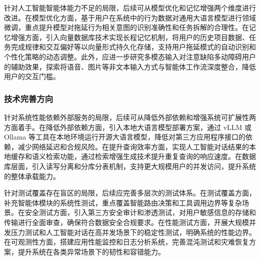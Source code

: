 \par 针对人工智能智能体能力不足的局限，后续可从模型优化和记忆增强两个维度进行改进。在模型优化方面，基于用户在系统中的行为数据对通用大语言模型进行领域微调，重点提升模型对拖延行为相关意图的识别准确性和任务拆解的合理性。在记忆增强方面，引入向量数据库技术实现长程记忆机制，将用户的历史项目数据、任务完成规律和交互偏好等以向量形式持久化存储，支持用户拖延模式的自动识别和个性化策略的动态调整。此外，应进一步研究多模态输入对注意缺陷多动障碍用户的辅助效果，探索将语音、图片等非文本输入方式与智能体工作流深度整合，降低用户的交互门槛。

\subsubsection{技术完善方向}

\par 针对系统性能依赖外部服务的局限，后续可从降低外部依赖和增强系统可扩展性两方面着手。在降低外部依赖方面，引入本地大语言模型部署方案，通过 vLLM 或 Ollama 等工具在本地环境运行开源大语言模型，降低对第三方应用程序接口的依赖，减少网络延迟和合规风险。在提升查询效率方面，实现人工智能对话结果的本地缓存和语义检索功能，通过检索增强生成技术提升重复查询的响应速度。在数据库层面，引入读写分离和分库分表机制，支持更大规模用户的并发访问，提升系统的整体承载能力。

\par 针对测试覆盖存在盲区的局限，后续应完善多层次的测试体系。在测试覆盖方面，补充智能体模块的系统性测试，重点覆盖智能路由决策和工具调用边界等复杂场景。在安全测试方面，引入第三方安全审计和渗透测试，对用户敏感信息的存储和传输进行全面审查，确保符合数据安全合规要求。在性能测试方面，开展大规模并发压力测试和人工智能对话在高并发场景下的稳定性测试，明确系统的性能边界。在可观测性方面，搭建应用性能监控和日志分析系统，完善混沌测试和灾难恢复方案，提升系统在各类异常场景下的韧性和容错能力。
